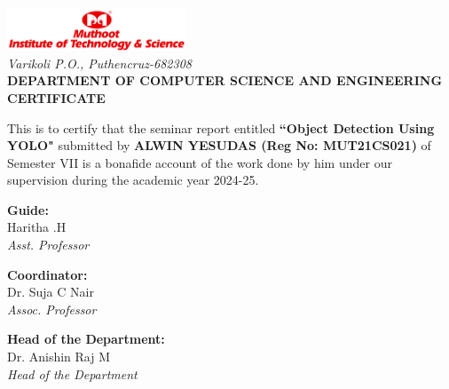 \documentclass[a4paper,12pt]{template}
\begin{document}
\begin{center}
    \includegraphics[width=0.4\textwidth]{images/Mits Logo.jpg}\\[0.5cm]
    \textit{Varikoli P.O., Puthencruz-682308}\\[2cm]
    
    {\Large \textbf{DEPARTMENT OF COMPUTER SCIENCE AND ENGINEERING}}\\[2cm]
    
    {\LARGE \textbf{CERTIFICATE}}\\[1cm]
\end{center}

\vspace{0.4cm}
\noindent
This is to certify that the seminar report entitled \textbf{``Object Detection Using YOLO"} submitted by \textbf{ALWIN YESUDAS (Reg No: MUT21CS021)} of Semester VII is a bonafide account of the work done by him under our supervision during the academic year 2024-25.

\vspace{3cm}
\noindent
\begin{center}
\begin{minipage}[t]{0.3\textwidth}
    \textbf{Guide:}\\[2cm]
    Haritha .H\\
    \textit{Asst. Professor}
\end{minipage}
\hfill
\begin{minipage}[t]{0.3\textwidth}
    \textbf{Coordinator:}\\[2cm]
    Dr. Suja C Nair\\
    \textit{Assoc. Professor}\\[2cm]
\end{minipage}
\hfill
\begin{minipage}[t]{0.3\textwidth}
    \textbf{Head of the Department:}\\[2cm]
    Dr. Anishin Raj M\\
    \textit{Head of the Department}
\end{minipage}
\end{center}
\end{document}
